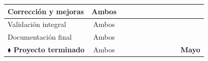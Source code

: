 \begin{table}[ht]
{\begin{tabular}{|l|c|c|c|c|c|c|c|c|c|c|}
Corrección y mejoras
& Ambos & & & & & \cellcolor{gray!40} &
\cellcolor{gray!40} & \cellcolor{gray!40} & & \\ \hline

Validación integral
& Ambos & & & & & & & \cellcolor{gray!40} &
\cellcolor{gray!40} & \\ \hline

Documentación final
& Ambos & & & & & & & & \cellcolor{gray!40} &
\cellcolor{gray!40} \\ \hline

\textbf{$\blacklozenge$ Proyecto terminado}
& Ambos & & & & & & & & & \textbf{Mayo} \\ \hline

\end{tabular}%
}
\end{table}
